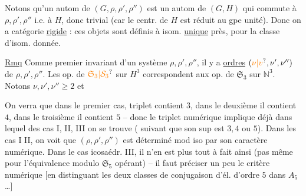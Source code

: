 Notons qu'un autom de $(G,\rho,\rho',\rho'')$ est un autom de $(G,H)$ qui commute à $\rho,\rho',\rho''$ i.e. à $H$, donc  trivial (car le centr. de $H$ est réduit au gpe unité). Donc on a catégorie \uline{rigide} : ces objets sont définis à isom. \uline{unique} près, pour la classe d'isom. donnée.


\uline{Rmq} Comme premier invariant d'un système $\rho,\rho',\rho''$, il y a   \uline{ordres} $(\unsure{\nu|v},\nu',\nu'')$ de $\rho,\rho',\rho''$. Les op. de $\unsure{\mathfrak S_3|\mathcal S_3}$ sur $H^3$ correspondent  aux op. de $\mathfrak S_3$ sur $\mathbb N^3$. Notons $\nu,\nu',\nu''\geq 2$ et


On verra que dans le premier cas,  triplet contient  $3$, dans le deuxième il contient $4$, dans le troisième il contient $5$ -- donc le triplet numérique implique déjà dans lequel des cas I, II, III on se trouve ( suivant que son sup est $3,4$ ou $5$). Dans les cas I II, on voit que $(\rho,\rho',\rho'')$ est déterminé mod iso par son caractère numérique. Dans le cas icosaédr. III, il n'en est plus tout à fait ainsi (pas même pour l'équivalence modulo $\mathfrak S_5$ opérant) -- il faut préciser un peu le critère numérique [en distinguant les deux classes de conjugaison d'él. d'ordre $5$ dans $A_5$ \ldots]



